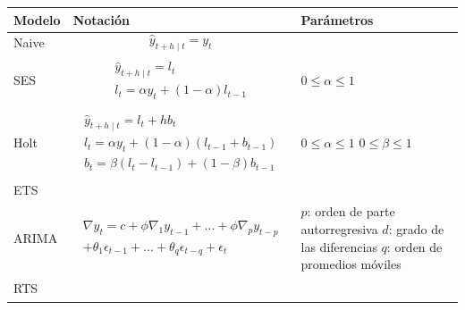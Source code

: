\begin{table}
	\centering
	\begin{adjustbox}{width=0.95\textwidth}
	\begin{tabular} {m{2cm} m{9cm} m{7cm}}
		\toprule
		\textbf{Modelo} & \textbf{\hspace{3cm}Notación} & \textbf{Parámetros}\\
		\midrule
		Naive&\begin{equation}\label{eqn:1}\hat{y}_{t+h \mid t} = y_{t}\end{equation}	  
		&\\
		SES&	
		\begin{align}
			\label{eqn:2}
			\begin{split}
				\hat{y}_{t+h\mid t} = l_{t}
				\\
				l_{t} = \alpha y_{t}+(1-\alpha)l_{t-1}
			\end{split}
		\end{align}
		& $0 \leq \alpha \leq 1$\\
		Holt 	&	
		\begin{align}
			\label{eqn:3}
			\begin{split}
				\hat{y}_{t+h\mid t} = l_{t}+hb_{t}
				\\
				l_{t} = \alpha y_{t}+(1-\alpha)(l_{t-1}+b_{t-1})
				\\
				b_{t} = \beta(l_{t}-l_{t-1})+(1-\beta)b_{t-1}
			\end{split}
		\end{align}
		& $0 \leq \alpha \leq 1$
		\newline $0 \leq \beta \leq 1$
		\\
		ETS\footnotemark	& &
		\\
		ARIMA 	&	
		\begin{align}
			\label{eqn:4}
			\begin{split}
				\nabla y_{t} = c + \phi \nabla_{1} y_{t-1}+...+\phi \nabla_{p} y_{t-p}\\
				+\theta_{1}\epsilon_{t-1}+...+\theta_{q}\epsilon_{t-q}+\epsilon_{t}
			\end{split}
		\end{align}
		& 
		$p$: orden de parte autorregresiva\newline
		$d$: grado de las diferencias\newline
		$q$: orden de promedios móviles\newline	
		\\
		RTS 		&	
		\begin{align}
			\label{eqn:5}
			\begin{split}

\end{split}
\end{align}
\end{tabular}
\end{adjustbox}
\end{table}
